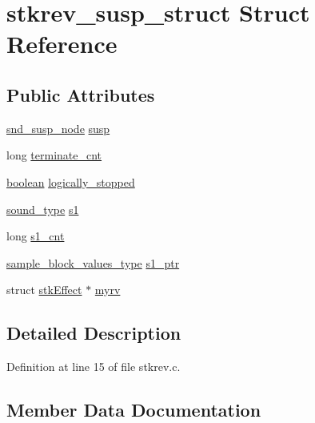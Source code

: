 \hypertarget{structstkrev__susp__struct}{}\section{stkrev\+\_\+susp\+\_\+struct Struct Reference}
\label{structstkrev__susp__struct}
\subsection*{Public Attributes}
\begin{DoxyCompactItemize}
\item 
\hyperlink{sound_8h_a6b268203688a934bd798ceb55f85d4c0}{snd\+\_\+susp\+\_\+node} \hyperlink{structstkrev__susp__struct_a090fafa29e9d7afaa4df14d8dcf41786}{susp}
\item 
long \hyperlink{structstkrev__susp__struct_a576c687abed167301e08b70740655063}{terminate\+\_\+cnt}
\item 
\hyperlink{cext_8h_a7670a4e8a07d9ebb00411948b0bbf86d}{boolean} \hyperlink{structstkrev__susp__struct_afe2e2fba2c4a2b215020db743490c0f4}{logically\+\_\+stopped}
\item 
\hyperlink{sound_8h_a792cec4ed9d6d636d342d9365ba265ea}{sound\+\_\+type} \hyperlink{structstkrev__susp__struct_aee767850f53ed819497f865558d02bdf}{s1}
\item 
long \hyperlink{structstkrev__susp__struct_af0c2ee4b9cf841facb8c31a661aa3cd3}{s1\+\_\+cnt}
\item 
\hyperlink{sound_8h_a83d17f7b465d1591f27cd28fc5eb8a03}{sample\+\_\+block\+\_\+values\+\_\+type} \hyperlink{structstkrev__susp__struct_aae05566a404628c024836c25fad37440}{s1\+\_\+ptr}
\item 
struct \hyperlink{structstk_effect}{stk\+Effect} $\ast$ \hyperlink{structstkrev__susp__struct_a31850b2e019d485f801f6052e74344bd}{myrv}
\end{DoxyCompactItemize}


\subsection{Detailed Description}


Definition at line 15 of file stkrev.\+c.



\subsection{Member Data Documentation}

